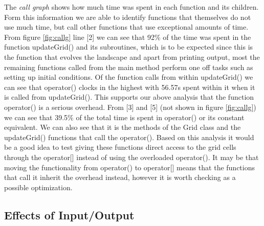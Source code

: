 The \textit{call graph} shows how much time was spent in each function and its children. Form this information we are able to identify functions that themselves do not use much time, but call other functions that use exceptional amounts of time. From figure \ref{fig:callg} line [2] we can see that 92\% of the time was spent in the function updateGrid() and its subroutines, which is to be expected since this is the function that evolves the landscape and apart from printing output, most the remaining functions called from the main method perform one off tasks such as setting up initial conditions. Of the function calls from within updateGrid() we can see that operator() clocks in the highest with 56.57s spent within it when it is called from updateGrid(). This supports our above analysis that the function operator() is a serious overhead. From [3] and [5] (not shown in figure \ref{fig:callg}) we can see that 39.5\% of the total time is spent in operator() or its constant equivalent. We can also see that it is the methods of the Grid class and the updateGrid() functions that call the operator(). Based on this analysis it would be a good idea to test giving these functions direct access to the grid cells through the operator[] instead of using the overloaded operator(). It may be that moving the functionality from operator() to operator[] means that the functions that call it inherit the overhead instead, however it is worth checking as a possible optimization. 




\subsection{Effects of Input/Output}
\label{subsec:input}

